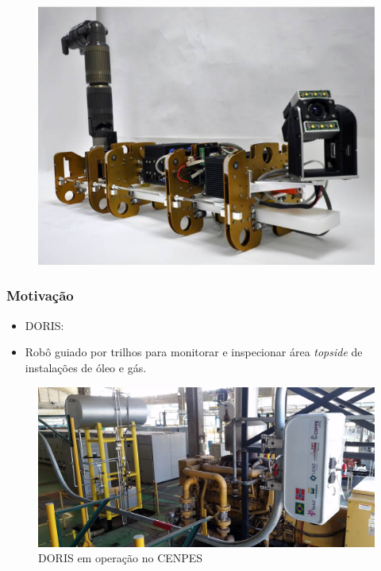 \documentclass{beamer}
\begin{document}
\begin{frame}
\begin{figure}[htp]
{  \includegraphics[height=\twosubht]{./img/artis.png}%
}
\end{figure}


\end{frame}


\begin{frame}
\frametitle{Motivação}
\begin{itemize}
\item DORIS:
\item Robô guiado por trilhos para monitorar e inspecionar área \textit{topside} de instalações de óleo e gás.
\end{itemize}
\begin{figure}
\includegraphics[width=0.8\linewidth]{./img/cenpes_field.jpg}
\caption{DORIS em operação no CENPES}
\end{figure}
\end{frame}

\end{document}
